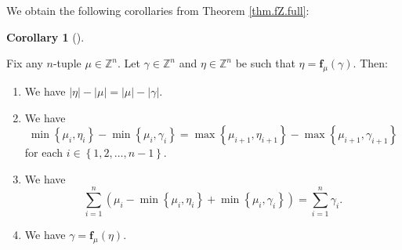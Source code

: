 \documentclass[numbers=enddot,12pt,final,onecolumn,notitlepage]{scrartcl}%
\theoremstyle{definition}
\newtheorem{coro}[theo]{Corollary}
\newenvironment{corollary}[1][]
{\begin{coro}[#1]\begin{leftbar}}
{\end{leftbar}\end{coro}}
\let\sumnonlimits\sum
\renewcommand{\sum}{\sumnonlimits\limits}
\begin{document}
We obtain the following corollaries from Theorem \ref{thm.fZ.full}:

\begin{corollary}
\label{cor.thm.fZ.full2}Fix any $n$-tuple $\mu\in\mathbb{Z}^{n}$. Let
$\gamma\in\mathbb{Z}^{n}$ and $\eta\in\mathbb{Z}^{n}$ be such that
$\eta=\mathbf{f}_{\mu}\left(  \gamma\right)  $. Then:

\begin{enumerate}
\item[\textbf{(a)}] We have $\left\vert \eta\right\vert -\left\vert
\mu\right\vert =\left\vert \mu\right\vert -\left\vert \gamma\right\vert $.

\item[\textbf{(b)}] We have%
\[
\min\left\{  \mu_{i},\eta_{i}\right\}  -\min\left\{  \mu_{i},\gamma
_{i}\right\}  =\max\left\{  \mu_{i+1},\eta_{i+1}\right\}  -\max\left\{
\mu_{i+1},\gamma_{i+1}\right\}
\]
for each $i\in\left\{  1,2,\ldots,n-1\right\}  $.

\item[\textbf{(c)}] We have%
\[
\sum_{i=1}^{n}\left(  \mu_{i}-\min\left\{  \mu_{i},\eta_{i}\right\}
+\min\left\{  \mu_{i},\gamma_{i}\right\}  \right)  =\sum_{i=1}^{n}\gamma_{i}.
\]


\item[\textbf{(d)}] We have $\gamma=\mathbf{f}_{\mu}\left(  \eta\right)  $.
\end{enumerate}
\end{corollary}
\end{document}
